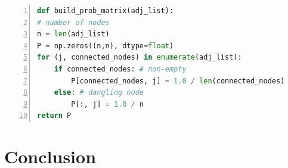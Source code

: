 \documentclass[11pt]{article}
\theoremstyle{definition}
\begin{document}
\begin{lstlisting}[language=python, basicstyle={\small\ttfamily}, numbers=left]
def build_prob_matrix(adj_list):
# number of nodes
n = len(adj_list)
P = np.zeros((n,n), dtype=float)
for (j, connected_nodes) in enumerate(adj_list):
    if connected_nodes: # non-empty
        P[connected_nodes, j] = 1.0 / len(connected_nodes)
    else: # dangling node
        P[:, j] = 1.0 / n
return P
\end{lstlisting}


\section{Conclusion}

\begin{thebibliography}{9}
\bibitem{}

\end{thebibliography}
\end{document}
